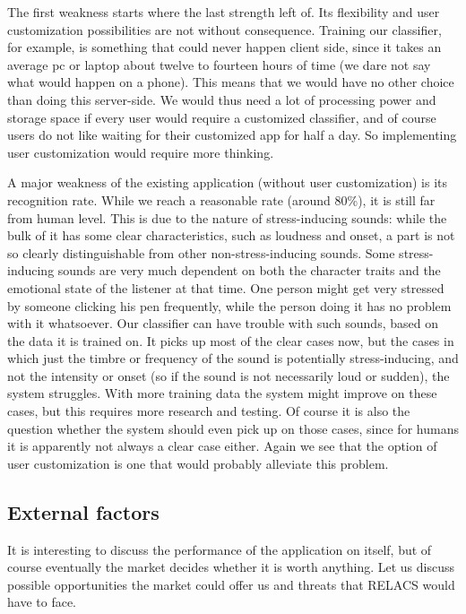 \documentclass[a4paper]{article}
\begin{document}
The first weakness starts where the last strength left of.
Its flexibility and user customization possibilities are not without consequence.
Training our classifier, for example, is something that could never happen client side, since it takes an average pc or laptop about twelve to fourteen hours of time (we dare not say what would happen on a phone).
This means that we would have no other choice than doing this server-side.
We would thus need a lot of processing power and storage space if every user would require a customized classifier, and of course users do not like waiting for their customized app for half a day.
So implementing user customization would require more thinking.

A major weakness of the existing application (without user customization) is its recognition rate.
While we reach a reasonable rate (around 80\%), it is still far from human level.
This is due to the nature of stress-inducing sounds:
while the bulk of it has some clear characteristics, such as loudness and onset, a part is not so clearly distinguishable from other non-stress-inducing sounds.
Some stress-inducing sounds are very much dependent on both the character traits and the emotional state of the listener at that time.
One person might get very stressed by someone clicking his pen frequently, while the person doing it has no problem with it whatsoever.
Our classifier can have trouble with such sounds, based on the data it is trained on.
It picks up most of the clear cases now,
but the cases in which just the timbre or frequency of the sound is potentially stress-inducing, and not the intensity or onset (so if the sound is not necessarily loud or sudden), the system struggles.
With more training data the system might improve on these cases, but this requires more research and testing.
Of course it is also the question whether the system should even pick up on those cases, since for humans it is apparently not always a clear case either.
Again we see that the option of user customization is one that would probably alleviate this problem.

\subsection{External factors}
It is interesting to discuss the performance of the application on itself, but of course eventually the market decides whether it is worth anything.
Let us discuss possible opportunities the market could offer us and threats that RELACS would have to face.
\end{document}
